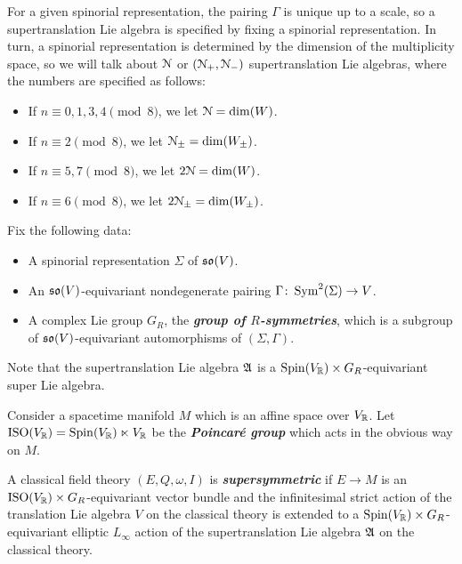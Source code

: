 \documentclass[10pt, oneside]{article}
\newcommand{\defterm}[1]{\textbf{\emph{#1}}}
\begin{document}
For a given spinorial representation, the pairing $\Gamma$ is unique up to a scale, so a supertranslation Lie algebra is specified by fixing a spinorial representation. In turn, a spinorial representation is determined by the dimension of the multiplicity space, so we will talk about $\mathcal{N}$ or $(\mathcal{N}_+, \mathcal{N}_-)$ supertranslation Lie algebras, where the numbers are specified as follows:
\begin{itemize}
\item If $n\equiv 0, 1, 3, 4\pmod 8$, we let $\mathcal{N} = \dim(W)$.

\item If $n\equiv 2 \pmod 8$, we let $\mathcal{N}_{\pm}=\dim(W_{\pm})$.

\item If $n\equiv 5, 7\pmod 8$, we let $2\mathcal{N} = \dim(W)$.

\item If $n\equiv 6\pmod 8$, we let $2\mathcal{N}_{\pm} = \dim(W_{\pm})$.
\end{itemize}

Fix the following data:
\begin{itemize}
\item A spinorial representation $\Sigma$ of $\mathfrak{so}(V)$.

\item An $\mathfrak{so}(V)$-equivariant nondegenerate pairing $\Gamma\colon \operatorname{Sym}^2(\Sigma)\rightarrow V$.

\item A complex Lie group $G_R$, the \defterm{group of $R$-symmetries}, which is a subgroup of $\mathfrak{so}(V)$-equivariant automorphisms of $(\Sigma, \Gamma)$.
\end{itemize}

Note that the supertranslation Lie algebra $\mathfrak A$ is a $\mathrm{Spin}(V_\mathbb R)\times G_R$-equivariant super Lie algebra.

Consider a spacetime manifold $M$ which is an affine space over $V_\mathbb R$. Let $\mathrm{ISO}(V_\mathbb R) = \mathrm{Spin}(V_\mathbb R)\ltimes V_\mathbb R$ be the \defterm{Poincar\'{e} group} which acts in the obvious way on $M$.

\begin{definition}
\label{dfn: super}
A classical field theory $(E, Q, \omega, I)$ is \defterm{supersymmetric} if $E\rightarrow M$ is an $\mathrm{ISO}(V_\mathbb R)\times G_R$-equivariant vector bundle and the infinitesimal strict action of the translation Lie algebra $V$ on the classical theory is extended to a $\mathrm{Spin}(V_\mathbb R)\times G_R$-equivariant elliptic $L_\infty$ action of the supertranslation Lie algebra $\mathfrak A$ on the classical theory.
\end{definition}
\end{document}
